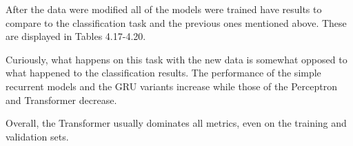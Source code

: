 \documentclass[bsc,frontabs,singlespacing,parskip,deptreport]{infthesis}
\begin{document}
\begin{table}
\begin{center}
\caption{AUC metric results on the genotyping task}
\end{center}
\vskip -5mm
\end{table}


After the data were modified all of the models were trained have results to compare to the classification task and the previous ones mentioned above. These are displayed in Tables 4.17-4.20.

Curiously, what happens on this task with the new data is somewhat opposed to what happened to the classification results. The performance of the simple recurrent models and the GRU variants increase while those of the Perceptron and Transformer decrease.

Overall, the Transformer usually dominates all metrics, even on the training and validation sets.
\end{document}
